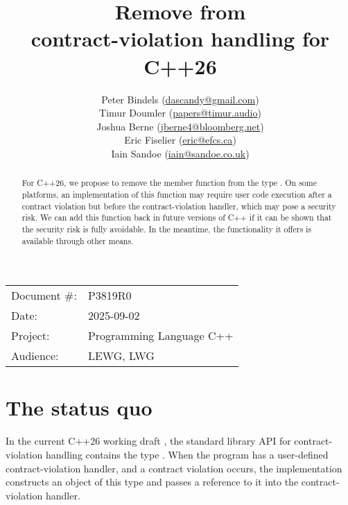 

 \usepackage[bottom]{footmisc} 



\title{Remove  from \\ contract-violation handling for C++26}
\author{
  Peter Bindels \small(\href{mailto:dascandy@gmail.com}{dascandy@gmail.com}) \\
  Timur Doumler \small(\href{mailto:papers@timur.audio}{papers@timur.audio}) \\
  Joshua Berne \small(\href{mailto:jberne4@bloomberg.net}{jberne4@bloomberg.net}) \\ 
  Eric Fiselier \small(\href{mailto:eric@efcs.ca}{eric@efcs.ca}) \\
  Iain Sandoe \small(\href{mailto:iain@sandoe.co.uk}{iain@sandoe.co.uk})
}
\date{}
\maketitle

\begin{tabular}{ll}
Document \#: & P3819R0 \\
Date: &2025-09-02 \\
Project: & Programming Language C++ \\
Audience: & LEWG, LWG
\end{tabular}

\begin{abstract}
For C++26, we propose to remove the member function  from the type . On some platforms, an implementation of this function may require user code execution after a contract violation but before the contract-violation handler, which may pose a security risk. We can add this function back in future versions of C++ if it can be shown that the security risk is fully avoidable. In the meantime, the functionality it offers is available through other means.
\end{abstract}


\section{The status quo}

In the current C++26 working draft \cite{N5014}, the standard library API for contract-violation handling contains the type . When the program has a user-defined contract-violation handler, and a contract violation occurs, the implementation constructs an object of this type and passes a reference to it into the contract-violation handler.

